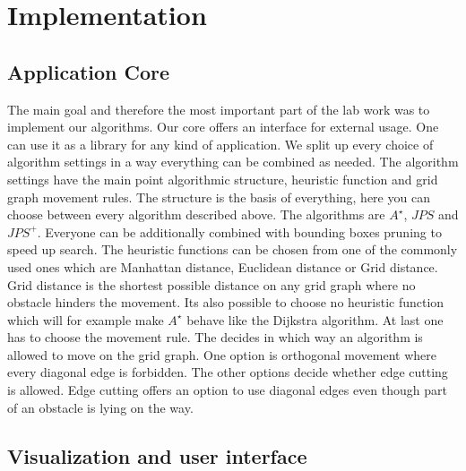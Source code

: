 \documentclass{article}
\begin{document}
    \section{Implementation}

    \subsection{Application Core}

    The main goal and therefore the most important part of the lab work was to implement our algorithms. Our core offers an interface for external usage. One can use it as a library for any kind of application. We split up every choice of algorithm settings in a way everything can be combined as needed. The algorithm settings have the main point algorithmic structure, heuristic function and grid graph movement rules. The structure is the basis of everything, here you can choose between every algorithm described above. The algorithms are $A^\star$, $JPS$ and $JPS^+$. Everyone can be additionally combined with bounding boxes pruning to speed up search. The heuristic functions can be chosen from one of the commonly used ones which are Manhattan distance, Euclidean distance or Grid distance. Grid distance is the shortest possible distance on any grid graph where no obstacle hinders the movement. Its also possible to choose no heuristic function which will for example make $A^\star$ behave like the Dijkstra algorithm. At last one has to choose the movement rule. The decides in which way an algorithm is allowed to move on the grid graph. One option is orthogonal movement where every diagonal edge is forbidden. The other options decide whether edge cutting is allowed. Edge cutting offers an option to use diagonal edges even though part of an obstacle is lying on the way.


    \subsection{Visualization and user interface}
\end{document}
